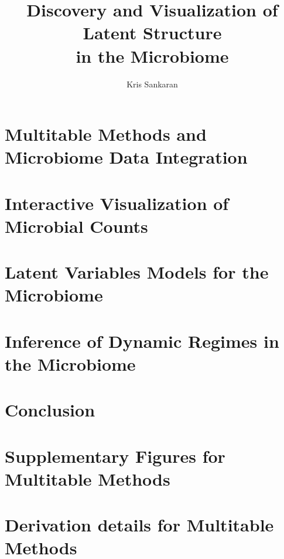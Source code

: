 \documentclass{report}
\title{Discovery and Visualization of Latent Structure \\ in the Microbiome}
\author{Kris Sankaran}
\begin{document}
\maketitle
\tableofcontents

\chapter{Multitable Methods and Microbiome Data Integration}
\label{ch:multitable}


\chapter{Interactive Visualization of Microbial Counts}
\label{ch:interactive_vis}


\chapter{Latent Variables Models for the Microbiome}
\label{ch:text_analysis}


\chapter{Inference of Dynamic Regimes in the Microbiome}
\label{ch:dynamic_regimes}


\chapter{Conclusion}

\appendix
\chapter{Supplementary Figures for Multitable Methods}


\chapter{Derivation details for Multitable Methods}




\end{document}
